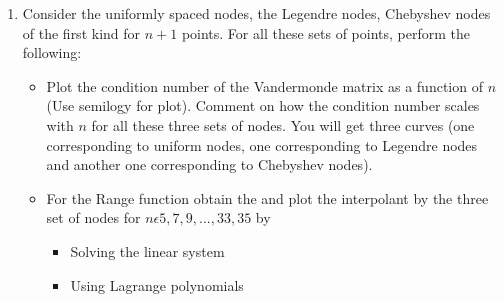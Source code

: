 \documentclass{article}
\begin{document}
\begin{enumerate}
\item Consider the uniformly spaced nodes, the Legendre nodes, Chebyshev nodes of the first kind for $n+1$ points. For all these sets of points, perform the following:

\begin{itemize}
\item Plot the condition number of the Vandermonde matrix as a function of $n$ (Use semilogy for plot). Comment on how the condition number scales with $n$ for all these three sets of nodes. You will get three curves (one corresponding to uniform nodes, one corresponding to Legendre nodes and another one corresponding to Chebyshev nodes).
\item For the Range function obtain the and plot the interpolant by the three set of nodes for $n \epsilon {5, 7, 9, ..., 33, 35}$ by

\begin{itemize}
\item Solving the linear system
\item Using Lagrange polynomials
\end{itemize}


\end{itemize}


\end{enumerate}
\end{document}
